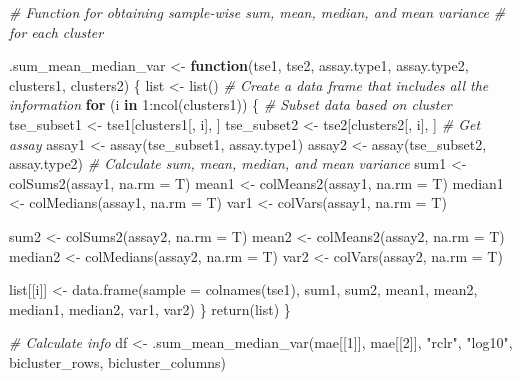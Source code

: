 \documentclass[
]{book}
\newenvironment{Shaded}{\begin{snugshade}}{\end{snugshade}}
\newcommand{\AttributeTok}[1]{\textcolor[rgb]{0.77,0.63,0.00}{#1}}
\newcommand{\CommentTok}[1]{\textcolor[rgb]{0.56,0.35,0.01}{\textit{#1}}}
\newcommand{\ControlFlowTok}[1]{\textcolor[rgb]{0.13,0.29,0.53}{\textbf{#1}}}
\newcommand{\DecValTok}[1]{\textcolor[rgb]{0.00,0.00,0.81}{#1}}
\newcommand{\FunctionTok}[1]{\textcolor[rgb]{0.00,0.00,0.00}{#1}}
\newcommand{\NormalTok}[1]{#1}
\newcommand{\OtherTok}[1]{\textcolor[rgb]{0.56,0.35,0.01}{#1}}
\newcommand{\SpecialCharTok}[1]{\textcolor[rgb]{0.00,0.00,0.00}{#1}}
\newcommand{\StringTok}[1]{\textcolor[rgb]{0.31,0.60,0.02}{#1}}
\begin{document}
\begin{Shaded}
\begin{Highlighting}[]
\CommentTok{\# Function for obtaining sample{-}wise sum, mean, median, and mean variance}
\CommentTok{\# for each cluster}

\NormalTok{.sum\_mean\_median\_var }\OtherTok{\textless{}{-}} \ControlFlowTok{function}\NormalTok{(tse1, tse2, assay.type1, assay.type2, clusters1, clusters2) \{}
\NormalTok{    list }\OtherTok{\textless{}{-}} \FunctionTok{list}\NormalTok{()}
    \CommentTok{\# Create a data frame that includes all the information}
    \ControlFlowTok{for}\NormalTok{ (i }\ControlFlowTok{in} \DecValTok{1}\SpecialCharTok{:}\FunctionTok{ncol}\NormalTok{(clusters1)) \{}
        \CommentTok{\# Subset data based on cluster}
\NormalTok{        tse\_subset1 }\OtherTok{\textless{}{-}}\NormalTok{ tse1[clusters1[, i], ]}
\NormalTok{        tse\_subset2 }\OtherTok{\textless{}{-}}\NormalTok{ tse2[clusters2[, i], ]}
        \CommentTok{\# Get assay}
\NormalTok{        assay1 }\OtherTok{\textless{}{-}} \FunctionTok{assay}\NormalTok{(tse\_subset1, assay.type1)}
\NormalTok{        assay2 }\OtherTok{\textless{}{-}} \FunctionTok{assay}\NormalTok{(tse\_subset2, assay.type2)}
        \CommentTok{\# Calculate sum, mean, median, and mean variance}
\NormalTok{        sum1 }\OtherTok{\textless{}{-}} \FunctionTok{colSums2}\NormalTok{(assay1, }\AttributeTok{na.rm =}\NormalTok{ T)}
\NormalTok{        mean1 }\OtherTok{\textless{}{-}} \FunctionTok{colMeans2}\NormalTok{(assay1, }\AttributeTok{na.rm =}\NormalTok{ T)}
\NormalTok{        median1 }\OtherTok{\textless{}{-}} \FunctionTok{colMedians}\NormalTok{(assay1, }\AttributeTok{na.rm =}\NormalTok{ T)}
\NormalTok{        var1 }\OtherTok{\textless{}{-}} \FunctionTok{colVars}\NormalTok{(assay1, }\AttributeTok{na.rm =}\NormalTok{ T)}
        
\NormalTok{        sum2 }\OtherTok{\textless{}{-}} \FunctionTok{colSums2}\NormalTok{(assay2, }\AttributeTok{na.rm =}\NormalTok{ T)}
\NormalTok{        mean2 }\OtherTok{\textless{}{-}} \FunctionTok{colMeans2}\NormalTok{(assay2, }\AttributeTok{na.rm =}\NormalTok{ T)}
\NormalTok{        median2 }\OtherTok{\textless{}{-}} \FunctionTok{colMedians}\NormalTok{(assay2, }\AttributeTok{na.rm =}\NormalTok{ T)}
\NormalTok{        var2 }\OtherTok{\textless{}{-}} \FunctionTok{colVars}\NormalTok{(assay2, }\AttributeTok{na.rm =}\NormalTok{ T)}
        
\NormalTok{        list[[i]] }\OtherTok{\textless{}{-}} \FunctionTok{data.frame}\NormalTok{(}\AttributeTok{sample =} \FunctionTok{colnames}\NormalTok{(tse1), sum1, sum2, mean1, }
\NormalTok{                                 mean2, median1, median2, var1, var2)}
\NormalTok{    \}}
    \FunctionTok{return}\NormalTok{(list)}
\NormalTok{\}}

\CommentTok{\# Calculate info}
\NormalTok{df }\OtherTok{\textless{}{-}} \FunctionTok{.sum\_mean\_median\_var}\NormalTok{(mae[[}\DecValTok{1}\NormalTok{]], mae[[}\DecValTok{2}\NormalTok{]], }\StringTok{"rclr"}\NormalTok{, }\StringTok{"log10"}\NormalTok{, bicluster\_rows, bicluster\_columns)}
\end{Highlighting}
\end{Shaded}
\end{document}
